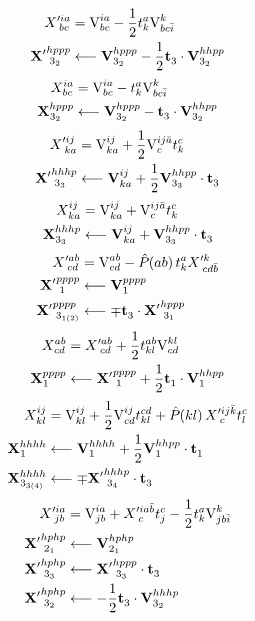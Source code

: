 \documentclass[thesis.tex]{subfiles}
\begin{document}
\begin{align}
  X'^{ia}_{\hspace{2.3pt} bc} &= \text{V}^{ia}_{bc} - \frac{1}{2}t^{a}_{k}\text{V}^{k}_{bc\bar{i}} \notag \\
  \mathbf{X'}^{hppp}_{\hspace{2.3pt} 3_{2}} &\longleftarrow \text{\textbf{V}}^{hppp}_{3_{2}} - \frac{1}{2}\mathbf{t}^{}_{3}\cdot\text{\textbf{V}}^{hhpp}_{3_{2}}
\end{align}
\begin{align}
  X^{ia}_{\hspace{0.3pt} bc} &= \text{V}^{ia}_{bc} - t^{a}_{k}\text{V}^{k}_{bc\bar{i}} \notag \\
  \mathbf{X}^{hppp}_{\hspace{0.3pt} 3_{2}} &\longleftarrow \text{\textbf{V}}^{hppp}_{3_{2}} - \mathbf{t}^{}_{3}\cdot\text{\textbf{V}}^{hhpp}_{3_{2}}
\end{align}
\begin{align}
  X'^{ij}_{\hspace{2.3pt} ka} &= \text{V}^{ij}_{ka} + \frac{1}{2}\text{V}^{ij\bar{a}}_{c}t^{c}_{k} \notag \\
  \mathbf{X'}^{hhhp}_{\hspace{2.3pt} 3_{3}} &\longleftarrow \text{\textbf{V}}^{ij}_{ka} + \frac{1}{2}\text{\textbf{V}}^{hhpp}_{3_{3}}\cdot\mathbf{t}^{}_{3}
\end{align}
\begin{align}
  X^{ij}_{\hspace{0.3pt} ka} &= \text{V}^{ij}_{ka} + \text{V}^{ij\bar{a}}_{c}t^{c}_{k} \notag \\
  \mathbf{X}^{hhhp}_{\hspace{0.3pt} 3_{3}} &\longleftarrow \text{\textbf{V}}^{ij}_{ka} + \text{\textbf{V}}^{hhpp}_{3_{3}}\cdot\mathbf{t}^{}_{3}
\end{align}
\begin{align}
  X'^{ab}_{\hspace{2.3pt} cd} &= \text{V}^{ab}_{cd} - \mathop{\hat{P}\hspace{-2pt}\left( ab\right) }t^{a}_{k}X'^{k}_{\hspace{2.3pt} cd\bar{b}} \notag \\
  \mathbf{X'}^{pppp}_{\hspace{2.3pt} 1} &\longleftarrow \text{\textbf{V}}^{pppp}_{1} \notag \\
  \mathbf{X'}^{pppp}_{\hspace{2.3pt} 3_{1(2)}} &\longleftarrow \mp\mathbf{t}^{}_{3}\cdot\mathbf{X'}^{hppp}_{\hspace{2.3pt} 3_{1}}
\end{align}
\begin{align}
  X^{ab}_{\hspace{0.3pt} cd} &= X'^{ab}_{\hspace{2.3pt} cd} + \frac{1}{2}t^{ab}_{kl}\text{V}^{kl}_{cd} \notag \\
  \mathbf{X}^{pppp}_{\hspace{0.3pt} 1} &\longleftarrow \mathbf{X'}^{pppp}_{\hspace{2.3pt} 1} + \frac{1}{2}\mathbf{t}^{}_{1}\cdot\text{\textbf{V}}^{hhpp}_{1}
\end{align}
\begin{align}
  X^{ij}_{\hspace{0.3pt} kl} &= \text{V}^{ij}_{kl} + \frac{1}{2}\text{V}^{ij}_{cd}t^{cd}_{kl} + \mathop{\hat{P}\hspace{-2pt}\left( kl\right) }X'^{ij\bar{k}}_{\hspace{2.3pt} c}t^{c}_{l} \notag \\
  \mathbf{X}^{hhhh}_{\hspace{0.3pt} 1} &\longleftarrow \text{\textbf{V}}^{hhhh}_{1} + \frac{1}{2}\text{\textbf{V}}^{hhpp}_{1}\cdot\mathbf{t}^{}_{1} \notag \\
  \mathbf{X}^{hhhh}_{\hspace{0.3pt} 3_{3(4)}} &\longleftarrow \mp\mathbf{X'}^{hhhp}_{\hspace{2.3pt} 3_{4}}\cdot\mathbf{t}^{}_{3}
\end{align}
\begin{align}
  X'^{ia}_{\hspace{2.3pt} jb} &= \text{V}^{ia}_{jb} + X'^{ia\bar{b}}_{\hspace{2.3pt} c}t^{c}_{j} - \frac{1}{2}t^{a}_{k}\text{V}^{k}_{jb\bar{i}} \notag \\
  \mathbf{X'}^{hphp}_{\hspace{2.3pt} 2_{1}} &\longleftarrow \text{\textbf{V}}^{hphp}_{2_{1}} \notag \\
  \mathbf{X'}^{hphp}_{\hspace{2.3pt} 3_{3}} &\longleftarrow \mathbf{X'}^{hppp}_{\hspace{2.3pt} 3_{3}}\cdot\mathbf{t}^{}_{3} \notag \\
  \mathbf{X'}^{hphp}_{\hspace{2.3pt} 3_{2}} &\longleftarrow -\frac{1}{2}\mathbf{t}^{}_{3}\cdot\text{\textbf{V}}^{hhhp}_{3_{2}}
\end{align}
\end{document}
